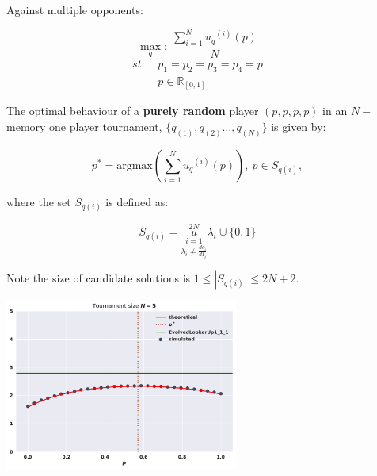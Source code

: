 \documentclass[usenames,dvipsnames,t]{beamer}
\newcommand{\R}{\mathbb{R}}
\begin{document}
\begin{columns}
\begin{column}{.45\linewidth}
        \textcolor{solarizedGreen}{Against multiple opponents:}
        \vspace{0.5cm}

        \[\max_q: \ \frac{\sum_{i=1} ^ {N} {u_q}^{(i)} (p)}{N}\]
        \begin{equation*}
            \begin{aligned}
            st: & \ p_1 = p_2 = p_3 = p_4 = p\\
                & \ p \in \R_{[0, 1]} 
            \end{aligned}
            \end{equation*}
            \vspace{0.5cm}

            \small{
            The optimal behaviour of a \textbf{purely random} player \((p, p, p, p)\)
            in an \(N-\)memory one player tournament, \(\{q_{(1)}, q_{(2)} \dots,q_{(N)} \}
            \) is given by:}
            \vspace{0.3cm}

            \[p^* = \text{argmax}(\displaystyle \sum_{i=1} ^ {N} {u_q}^{(i)} (p)), \ p \in S_{q(i)},\]
            \vspace{0.3cm}
            
            \small{
            where the set \(S_{q(i)}\) is defined as:}
            
            \[ S_{q(i)} =  \overset{2N}{\underset{\lambda_i \neq \frac{do_i}{d1_i}}{\underset{i=1}{u}}} \lambda_i \cup \{0, 1\} \]
            \vspace{0.3cm}

            Note the size of candidate solutions is \( 1 \leq|S_{q(i)}| \leq 2N + 2\).
            \vspace{0.3cm}

            \begin{center}
                \includegraphics[width=0.6\textwidth]{static/random_vs_multiple}
            \end{center}
            \vspace{0.3cm}
    \end{column}
    \begin{column}{.03\linewidth}
    \end{column}
\end{columns}
\end{document}
